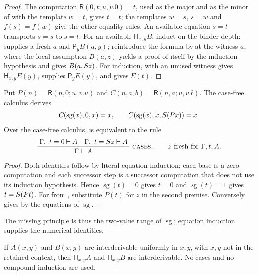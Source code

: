 \begin{proof}
The computation $\mathsf{R}(0,t;u,v.0)=t$, used as the major and as the minor
of  with the template $w=t$, gives $t=t$; the templates $w=s$,
$s=w$ and $f(s)=f(w)$ give the other equality rules. An available equation
$s=t$ transports $s=s$ to $s=t$. For an available $\mathsf{H}_{x,y}B$, induct
on the binder depth:  supplies a fresh $a$ and
$\mathsf{P}_{y}B(a,y)$; reintroduce the formula by  at the witness
$a$, where the local assumption $B(a,z)$ yields a proof of itself by the
induction hypothesis and  gives $B(a,S z)$. For induction,
 with an unused witness gives $\mathsf{H}_{x,y}E(y)$,
 supplies $\mathsf{P}_{y}E(y)$, and  gives $E(t)$.
\end{proof}

\begin{lemma}
\label{obs:lem:Hcases}
Put $P(n)=\mathsf{R}(n,0;u,v.u)$ and $C(n,a,b)=\mathsf{R}(n,a;u,v.b)$. The
case-free calculus derives
\[
C(\operatorname{sg}(x),0,x)=x,\qquad C(\operatorname{sg}(x),x,S(Px))=x .
\]
Over the case-free calculus,  is equivalent to the rule
\[
\infrule{\Gamma,\ t=0\proves A\quad\Gamma,\ t=\Suc z\proves A}{\Gamma\proves A}\ \rulename{Cases},
\qquad z \text{ fresh for } \Gamma,t,A .
\]
\end{lemma}

\begin{proof}
Both identities follow by literal-equation induction; each base is a zero
computation and each successor step is a successor computation that does not
use its induction hypothesis. Hence $\operatorname{sg}(t)=0$ gives $t=0$ and
$\operatorname{sg}(t)=1$ gives $t=S(Pt)$. For  from
, substitute $P(t)$ for $z$ in the second premise.
Conversely  gives  by the equations of
$\operatorname{sg}$.
\end{proof}

The missing principle is thus the two-value range of $\operatorname{sg}$;
equation induction supplies the numerical identities.

\begin{lemma}
\label{obs:lem:Hcong}
If $A(x,y)$ and $B(x,y)$ are interderivable uniformly in $x,y$, with $x,y$ not
in the retained context, then $\mathsf{H}_{x,y}A$ and $\mathsf{H}_{x,y}B$ are
interderivable. No cases and no compound induction are used.
\end{lemma}

